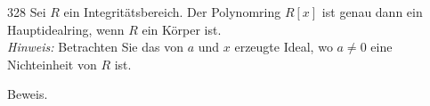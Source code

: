 \begin{algebraUE}{328}
Sei $R$ ein Integritätsbereich. Der Polynomring $R[x]$ ist genau dann ein
Hauptidealring, wenn $R$ ein Körper ist. \\
\textit{Hinweis:} Betrachten Sie das von $a$ und $x$ erzeugte Ideal, wo $a \neq 0$
eine Nichteinheit von $R$ ist.
\end{algebraUE}
\begin{solution}
Beweis.
\end{solution}
